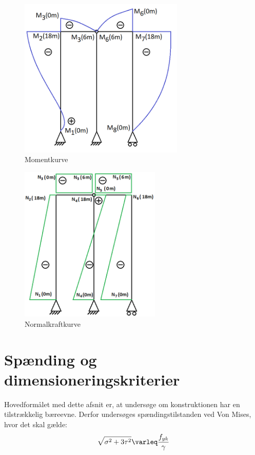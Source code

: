 \begin{figure}[H]
	\centering
	\includegraphics[width=0.7\textwidth]{billeder/skkm.png}
	\caption{Momentkurve}
	\label{fig:momentkurve}
\end{figure}

\begin{figure}[H]
	\centering
	\includegraphics[width=0.6\textwidth]{billeder/SKFN.png}
	\caption{Normalkraftkurve}
	\label{fig:normalkraftkurve}
\end{figure}

\section{Spænding og dimensioneringskriterier}
Hovedformålet med dette afsnit er, at undersøge om konstruktionen har en tilstrækkelig bæreevne. Derfor undersøges spændingstilstanden ved Von Mises, hvor det skal gælde: 
\begin{equation}
	\sqrt{\sigma^2 + 3\tau^2} \varleq \frac{f_{yk}}{\gamma}
\end{equation}

